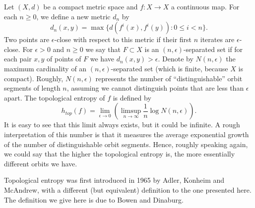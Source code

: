 \documentclass[12pt]{article}
\begin{document}
Let $(X,d)$ be a compact metric space and $f\colon X\to X$ a continuous map.
For each $n\geq 0$, we define a new metric $d_n$ by $$d_n(x,y)=\max\{d(f^i(x),f^i(y)): 0\leq i<n\}.$$
Two points are $\epsilon$-close with respect to this metric if their first $n$ iterates are $\epsilon$-close.
For $\epsilon>0$ and $n\geq 0$ we say that $F\subset X$ is an $(n,\epsilon)$-separated set if for each pair $x,y$ of points of $F$ we have $d_n(x,y)>\epsilon$. Denote by $N(n,\epsilon)$ the maximum cardinality of an $(n,\epsilon)$-separated set (which is finite, because $X$ is compact). Roughly, $N(n,\epsilon)$ represents the number of ``distinguishable'' orbit segments of length $n$, assuming we cannot distinguish points that are less than $\epsilon$ apart. 
The topological entropy of $f$ is defined by
$$h_{top}(f)=\lim_{\epsilon\to 0} \left(\limsup_{n\to \infty} \frac{1}{n}\log N(n,\epsilon)\right).$$
It is easy to see that this limit always exists, but it could be infinite.
A rough interpretation of this number is that it measures the average exponential growth of the number of distinguishable orbit segments. Hence, roughly speaking again, we could say that the higher the topological entropy is, the more essentially different orbits we have. 

Topological entropy was first introduced in 1965 by Adler, Konheim and McAndrew, with a different (but equivalent) definition to the one presented here. The definition we give here is due to Bowen and Dinaburg.
\end{document}

